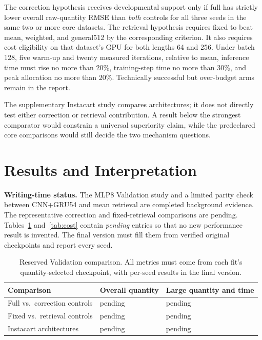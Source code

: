 \documentclass[runningheads]{llncs}
\begin{document}
The correction hypothesis receives developmental
support only if full has strictly lower overall
raw-quantity RMSE than \emph{both} controls for
all three seeds in the same two or more core
datasets. The retrieval hypothesis requires
fixed to beat mean, weighted, and general512
by the corresponding criterion. It also requires
cost eligibility on that dataset's GPU for
both lengths 64 and 256. Under batch 128,
five warm-up and twenty measured iterations,
relative to mean, inference time must rise
no more than 20\%, training-step time no
more than 30\%, and peak allocation no more
than 20\%. Technically successful but
over-budget arms remain in the report.

The supplementary Instacart study compares
architectures; it does not directly test either
correction or retrieval contribution. A result
below the strongest comparator would constrain
a universal superiority claim, while the
predeclared core comparisons would still decide
the two mechanism questions.

\section{Results and Interpretation}
\noindent\textbf{Writing-time status.}
The MLP8 Validation study and a limited parity
check between CNN+GRU54 and mean retrieval
are completed background evidence. The
representative correction and fixed-retrieval
comparisons are pending. Tables~\ref{tab:results}
and~\ref{tab:cost} contain \emph{pending}
entries so that no new performance result is
invented. The final version must fill them
from verified original checkpoints and report
every seed.

\begin{table}[t]
\caption{Reserved Validation comparison. All
metrics must come from each fit's quantity-selected
checkpoint, with per-seed results in the final version.}
\label{tab:results}
\centering\small
\begin{tabular}{@{}p{}p{}p{}@{}}
\toprule
Comparison & Overall quantity &
Large quantity and time\\
\midrule
Full vs.\ correction controls &
pending & pending\\
Fixed vs.\ retrieval controls &
pending & pending\\
Instacart architectures &
pending & pending\\
\bottomrule
\end{tabular}
\end{table}
\end{document}
